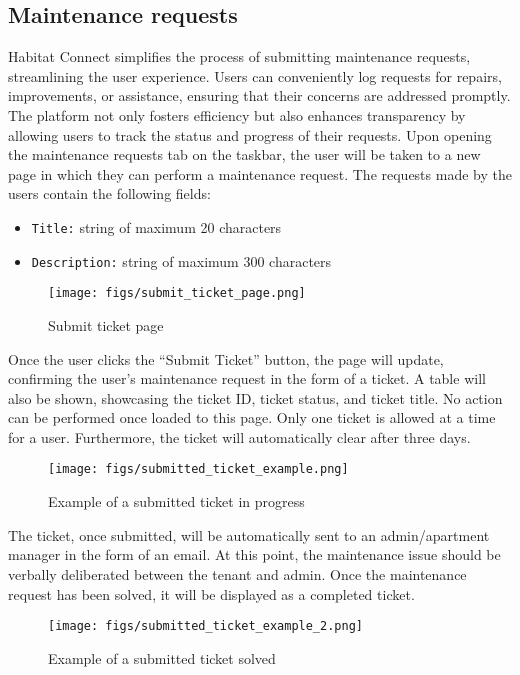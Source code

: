\documentclass[conference]{IEEEtran}
\begin{document}
\subsection{Maintenance requests}
Habitat Connect simplifies the process of submitting maintenance requests, streamlining the user experience. Users can conveniently log requests for repairs, improvements, or assistance, ensuring that their concerns are addressed promptly. The platform not only fosters efficiency but also enhances transparency by allowing users to track the status and progress of their requests. Upon opening the maintenance requests tab on the taskbar, the user will be taken to a new page in which they can perform a maintenance request.
The requests made by the users contain the following fields:
\begin{itemize}
    \item \texttt{Title:} string of maximum 20 characters
    \item \texttt{Description:} string of maximum 300 characters
\end{itemize}
    \begin{figure}[H]
    \centering
    \texttt{[image: figs/submit\_ticket\_page.png]}
    \caption{Submit ticket page}
    \label{fig:Submit ticket page}
    \end{figure}
Once the user clicks the “Submit Ticket” button, the page will update, confirming the user's maintenance request in the form of a ticket. A table will also be shown, showcasing the ticket ID, ticket status, and ticket title. No action can be performed once loaded to this page. Only one ticket is allowed at a time for a user. Furthermore, the ticket will automatically clear after three days.
    \begin{figure}[H]
    \centering
    \texttt{[image: figs/submitted\_ticket\_example.png]}
    \caption{Example of a submitted ticket in progress}
    \label{fig:Example of a submitted ticket in progress}
    \end{figure}
The ticket, once submitted, will be automatically sent to an admin/apartment manager in the form of an email. At this point, the maintenance issue should be verbally deliberated between the tenant and admin. Once the maintenance request has been solved, it will be displayed as a completed ticket. 
    \begin{figure}[H]
    \centering
    \texttt{[image: figs/submitted\_ticket\_example\_2.png]}
    \caption{Example of a submitted ticket solved}
    \label{fig:Example of a submitted ticket solved}
    \end{figure}
\end{document}
